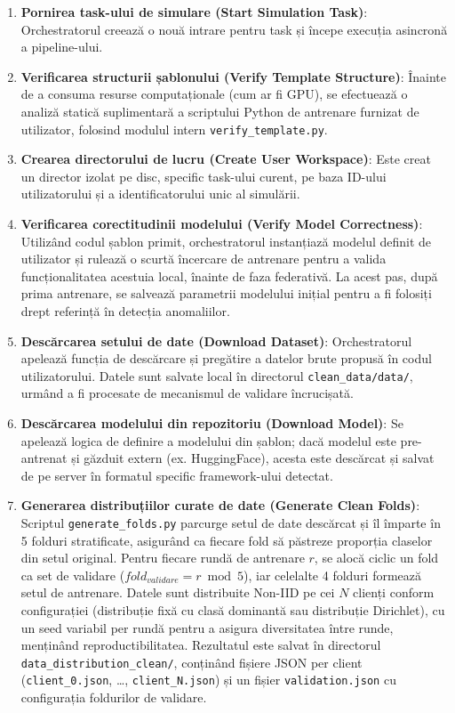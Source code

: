 \documentclass[../../main.tex]{subfiles}
\begin{document}
    \begin{enumerate}
        \item \textbf{Pornirea task-ului de simulare (Start Simulation Task)}: Orchestratorul creează o nouă intrare pentru task și începe execuția asincronă a pipeline-ului.
        \item \textbf{Verificarea structurii șablonului (Verify Template Structure)}: Înainte de a consuma resurse computaționale (cum ar fi GPU), se efectuează o analiză statică suplimentară a scriptului Python de antrenare furnizat de utilizator, folosind modulul intern \texttt{verify\_tem\-plate.py}.
        \item \textbf{Crearea directorului de lucru (Create User Workspace)}: Este creat un director izolat pe disc, specific task-ului curent, pe baza ID-ului utilizatorului și a identificatorului unic al simulării.
        \item \textbf{Verificarea corectitudinii modelului (Verify Model Correctness)}: Utilizând codul șablon primit, orchestratorul instanțiază modelul definit de utilizator și rulează o scurtă încercare de antrenare pentru a valida funcționa\-litatea acestuia local, înainte de faza federativă. La acest pas, după prima antrenare, se salvează parametrii modelului inițial pentru a fi folosiți drept referință în detecția anomaliilor.
        \item \textbf{Descărcarea setului de date (Download Dataset)}: Orchestratorul apelează funcția de descărcare și pregătire a datelor brute propusă în codul utilizatorului. Datele sunt salvate local în directorul \texttt{clean\_data/data/}, urmând a fi procesate de mecanismul de validare încrucișată.
        \item \textbf{Descărcarea modelului din repozitoriu (Download Model)}: Se apelează logica de definire a modelului din șablon; dacă modelul este pre-antrenat și găzduit extern (ex. HuggingFace), acesta este descărcat și salvat de pe server în formatul specific framework-ului detectat.
        \item \textbf{Generarea distribuțiilor curate de date (Generate Clean Folds)}: Scriptul \texttt{generate\allowbreak\_folds.py} parcurge setul de date descărcat și îl împarte în 5 folduri stratificate, asigurând ca fiecare fold să păstreze proporția claselor din setul original. Pentru fiecare rundă de antrenare $r$, se alocă ciclic un fold ca set de validare ($fold_{validare} = r \bmod 5$), iar celelalte 4 folduri formează setul de antrenare. Datele sunt distribuite Non-IID pe cei $N$ clienți conform configurației (distribuție fixă cu clasă dominantă sau distribuție Dirichlet), cu un seed variabil per rundă pentru a asigura diversitatea între runde, menținând reproductibilitatea. Rezultatul este salvat în directorul \texttt{data\_distribution\_clean/}, conținând fișiere JSON per client (\texttt{client\_0.json}, \dots, \texttt{client\_N.json}) și un fișier \texttt{validation.json} cu configurația foldurilor de validare.

\end{enumerate}
\end{document}
